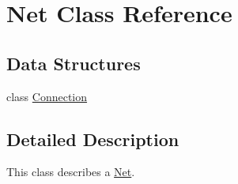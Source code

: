 \hypertarget{class_net}{}\section{Net Class Reference}
\label{class_net}
\subsection*{Data Structures}
\begin{DoxyCompactItemize}
\item 
class \mbox{\hyperlink{class_net_1_1_connection}{Connection}}
\end{DoxyCompactItemize}


\subsection{Detailed Description}
This class describes a \mbox{\hyperlink{class_net}{Net}}. 